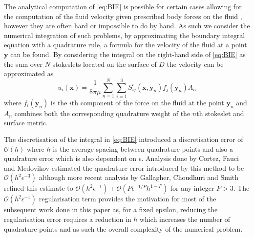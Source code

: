 The analytical computation of \cref{eq:BIE} is possible for certain cases allowing for the computation of the fluid velocity given prescribed body forces on the fluid \cite{Walker2020AFilaments,Zhao2021RegularizedFlow,Ohm2021RemarksTheory,Zhao2019}, however they are often hard or impossible to do by hand. As such we consider the numerical integration of such problems, by approximating the boundary integral equation with a quadrature rule, a formula for the velocity of the fluid at a point $\bm{y}$ can be found. By considering the integral on the right-hand side of \cref{eq:BIE} as the sum over $N$ stokeslets located on the surface of $D$ the velocity can be approximated as
\begin{equation}
\label{eq:Stokesletsum}
    u_{i}\left(\bm{x}\right)=\frac{1}{8 \pi \mu} \sum_{n=1}^{N} \sum_{i=1}^{3} S_{i j}^{\epsilon}\left(\bm{x}, {\bm{y}}_{n}\right) {f}_{j}({\bm{y}}_{n}) A_{n}
\end{equation}
where ${f}_{i}({\bm{y}}_n)$ is the $i$th component of the force on the fluid at the point ${\bm{y}}_n$ and $A_n$ combines both the corresponding quadrature weight of the $n$th stokeslet and surface metric.

The discretisation of the integral in \cref{eq:BIE} introduced a discretisation error of $\mathcal{O}(h)$ where $h$ is the average spacing between quadrature points and also a quadrature error which is also dependent on $\epsilon$. Analysis done by Cortez, Fauci and Medovikov\cite{Cortez2005} estimated the quadrature error introduced by this method to be $\mathcal{O}(h^2\epsilon^{-3})$ although more recent analysis by Gallagher, Choudhuri and Smith\cite{Gallagher2019SharpEquation} refined this estimate to $\mathcal{O}(h^2\epsilon^{-1}) + \mathcal{O}(P\epsilon^{-1/P} h^{1-P})$ for any integer $P>3$. The $\mathcal{O}(h^2\epsilon^{-1})$ regularisation term provides the motivation for most of the subsequent work done in this paper as, for a fixed epsilon, reducing the regularisation error requires a reduction in $h$ which increases the number of quadrature points and as such the overall complexity of the numerical problem. 

